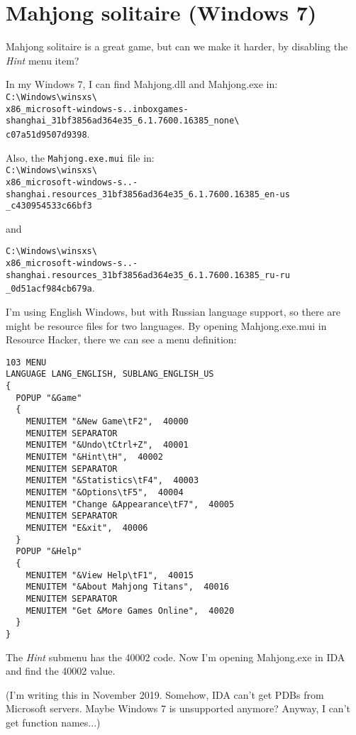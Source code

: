 ﻿\section{Mahjong solitaire (Windows 7)}

Mahjong solitaire is a great game, but can we make it harder, by disabling the \emph{Hint} menu item?

In my Windows 7, I can find Mahjong.dll and Mahjong.exe in:\\
\verb|C:\Windows\winsxs\| \\
\verb|x86_microsoft-windows-s..inboxgames-shanghai_31bf3856ad364e35_6.1.7600.16385_none\| \\
\verb|c07a51d9507d9398|.

Also, the \verb|Mahjong.exe.mui| file in:\\
\verb|C:\Windows\winsxs\| \\
\verb|x86_microsoft-windows-s..-shanghai.resources_31bf3856ad364e35_6.1.7600.16385_en-us| \\
\verb|_c430954533c66bf3|

and

\verb|C:\Windows\winsxs\| \\
\verb|x86_microsoft-windows-s..-shanghai.resources_31bf3856ad364e35_6.1.7600.16385_ru-ru| \\
\verb|_0d51acf984cb679a|.

I'm using English Windows, but with Russian language support, so there are might be resource files for two languages.
By opening Mahjong.exe.mui in Resource Hacker, there we can see a menu definition:

\begin{lstlisting}[caption=Menu resources from Mahjong.exe.mui]
103 MENU
LANGUAGE LANG_ENGLISH, SUBLANG_ENGLISH_US
{
  POPUP "&Game"
  {
    MENUITEM "&New Game\tF2",  40000
    MENUITEM SEPARATOR
    MENUITEM "&Undo\tCtrl+Z",  40001
    MENUITEM "&Hint\tH",  40002
    MENUITEM SEPARATOR
    MENUITEM "&Statistics\tF4",  40003
    MENUITEM "&Options\tF5",  40004
    MENUITEM "Change &Appearance\tF7",  40005
    MENUITEM SEPARATOR
    MENUITEM "E&xit",  40006
  }
  POPUP "&Help"
  {
    MENUITEM "&View Help\tF1",  40015
    MENUITEM "&About Mahjong Titans",  40016
    MENUITEM SEPARATOR
    MENUITEM "Get &More Games Online",  40020
  }
}
\end{lstlisting}

The \emph{Hint} submenu has the 40002 code.
Now I'm opening Mahjong.exe in IDA and find the 40002 value.

(I'm writing this in November 2019. Somehow, IDA can't get PDBs from Microsoft servers. Maybe Windows 7 is unsupported anymore?
Anyway, I can't get function names...)

